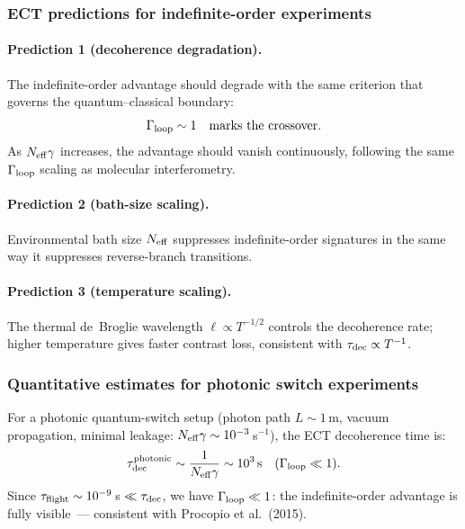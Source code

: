 \documentclass[11pt,a4paper]{article}
\numberwithin{equation}{section}
\begin{document}
\subsubsection*{ECT predictions for indefinite-order experiments}

\paragraph{Prediction 1 (decoherence degradation).}
The indefinite-order advantage should degrade with the same criterion
that governs the quantum--classical boundary:
\begin{equation}
  \label{eq:indef_causal_criterion}
  \Gamma_{\rm loop} \sim 1 \quad\text{marks the crossover.}
\end{equation}
As $N_{\rm eff}\gamma$ increases, the advantage should vanish
continuously, following the same $\Gamma_{\rm loop}$ scaling
as molecular interferometry.

\paragraph{Prediction 2 (bath-size scaling).}
Environmental bath size $N_{\rm eff}$ suppresses indefinite-order
signatures in the same way it suppresses reverse-branch transitions.

\paragraph{Prediction 3 (temperature scaling).}
The thermal de~Broglie wavelength $\ell\propto T^{-1/2}$ controls
the decoherence rate; higher temperature gives faster contrast loss,
consistent with $\tau_{\rm dec}\propto T^{-1}$.

\subsubsection*{Quantitative estimates for photonic switch experiments}

For a photonic quantum-switch setup (photon path $L\sim1$\,m,
vacuum propagation, minimal leakage:
$N_{\rm eff}\gamma\sim10^{-3}$\,s$^{-1}$), the ECT decoherence time is:
\begin{equation}
  \tau_{\rm dec}^{\rm photonic}
  \sim \frac{1}{N_{\rm eff}\gamma}
  \sim 10^{3}\,\text{s}
  \quad(\Gamma_{\rm loop}\ll 1).
  \label{eq:indef_tau}
\end{equation}
Since $\tau_{\rm flight}\sim10^{-9}$\,s $\ll\tau_{\rm dec}$,
we have $\Gamma_{\rm loop}\ll1$: the indefinite-order advantage
is fully visible~--- consistent with Procopio et al.\ (2015).
\end{document}
